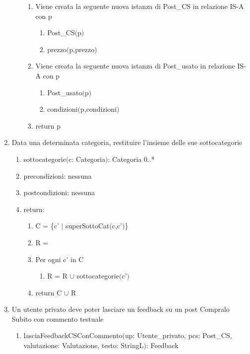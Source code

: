 \documentclass{article}
\begin{document}
\begin{enumerate}
\begin{enumerate}
\begin{enumerate}
            \item Viene creata la seguente nuova istanza di Post\_CS in relazione IS-A con p
            \begin{enumerate}
                \item Post\_CS$($p$)$
                \item prezzo$($p,prezzo$)$
            \end{enumerate}
            \item Viene creata la seguente nuova istanza di Post\_usato in relazione IS-A con p
            \begin{enumerate}
                \item Post\_usato$($p$)$
                \item condizioni$($p,condizioni$)$
            \end{enumerate}
            \item return p
        \end{enumerate}
    \end{enumerate}
    \item Data una determinata categoria, restituire l'insieme delle sue sottocategorie
    \begin{enumerate}
        \item sottocategorie$($c: Categoria$)$: Categoria 0..*
        \item precondizioni: nessuna
        \item postcondizioni: nessuna
        \item return:
        \begin{enumerate}
            \item C = \{c' $|$ superSottoCat$($c,c'$)$\}
            \item R = {}
            \item Per ogni c' in C
            \begin{enumerate}
                \item R = R $\cup$ sottocategorie$($c'$)$
            \end{enumerate}
            \item return C $\cup$ R
        \end{enumerate}
    \end{enumerate}
    \item Un utente privato deve poter lasciare un feedback su un post Compralo Subito con commento testuale
    \begin{enumerate}
        \item lasciaFeedbackCSConCommento$($up: Utente\_privato, pcs: Post\_CS, valutazione: Valutazione, testo: StringL$)$: Feedback

\end{enumerate}
\end{enumerate}
\end{document}
